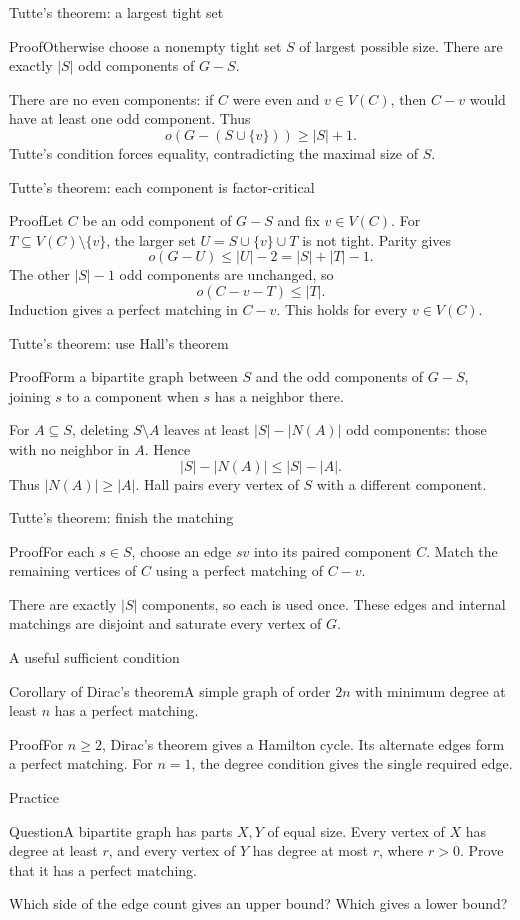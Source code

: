 \documentclass[aspectratio=169,11pt]{beamer}
\newcommand{\Thm}[2]{\begin{block}{#1}#2\end{block}}
\renewcommand{\Proof}[1]{\begin{block}{Proof}\normalsize #1\end{block}}
\newcommand{\Question}[1]{\begin{block}{Question}#1\end{block}}
\newcommand{\gap}{\par\medskip}
\begin{document}
\begin{frame}{Tutte's theorem: a largest tight set}
\large
\Proof{Otherwise choose a nonempty tight set $S$ of largest possible size. There are exactly $|S|$ odd components of $G-S$.\gap There are no even components: if $C$ were even and $v\in V(C)$, then $C-v$ would have at least one odd component. Thus
\[o(G-(S\cup\{v\}))\geq |S|+1.\]
Tutte's condition forces equality, contradicting the maximal size of $S$.}
\end{frame}
\begin{frame}{Tutte's theorem: each component is factor-critical}
\large
\Proof{Let $C$ be an odd component of $G-S$ and fix $v\in V(C)$. For $T\subseteq V(C)\setminus\{v\}$, the larger set $U=S\cup\{v\}\cup T$ is not tight. Parity gives
\[o(G-U)\leq |U|-2=|S|+|T|-1.\]
The other $|S|-1$ odd components are unchanged, so
\[o(C-v-T)\leq |T|.\]
Induction gives a perfect matching in $C-v$. This holds for every $v\in V(C)$.}
\end{frame}
\begin{frame}{Tutte's theorem: use Hall's theorem}
\large
\Proof{Form a bipartite graph between $S$ and the odd components of $G-S$, joining $s$ to a component when $s$ has a neighbor there.\gap For $A\subseteq S$, deleting $S\setminus A$ leaves at least $|S|-|N(A)|$ odd components: those with no neighbor in $A$. Hence
\[|S|-|N(A)|\leq |S|-|A|.\]
Thus $|N(A)|\geq|A|$. Hall pairs every vertex of $S$ with a different component.}
\end{frame}
\begin{frame}{Tutte's theorem: finish the matching}
\large
\Proof{For each $s\in S$, choose an edge $sv$ into its paired component $C$. Match the remaining vertices of $C$ using a perfect matching of $C-v$.\gap There are exactly $|S|$ components, so each is used once. These edges and internal matchings are disjoint and saturate every vertex of $G$.}
\end{frame}
\begin{frame}{A useful sufficient condition}
\large
\Thm{Corollary of Dirac's theorem}{A simple graph of order $2n$ with minimum degree at least $n$ has a perfect matching.}
\Proof{For $n\geq2$, Dirac's theorem gives a Hamilton cycle. Its alternate edges form a perfect matching. For $n=1$, the degree condition gives the single required edge.}
\end{frame}
\begin{frame}{Practice}
\large
\Question{A bipartite graph has parts $X,Y$ of equal size. Every vertex of $X$ has degree at least $r$, and every vertex of $Y$ has degree at most $r$, where $r>0$. Prove that it has a perfect matching.}
\gap Which side of the edge count gives an upper bound? Which gives a lower bound?
\end{frame}
\end{document}
